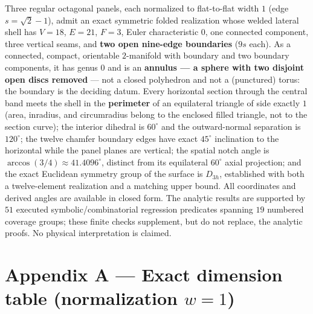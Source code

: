 \documentclass[
  11pt,
  a4paper,
]{article}
\begin{document}
Three regular octagonal panels, each normalized to flat-to-flat width \(1\) (edge \(s=\sqrt2-1\)), admit an exact symmetric folded realization whose welded lateral shell has \(V=18\), \(E=21\), \(F=3\), Euler characteristic \(0\), one connected component, three vertical seams, and \textbf{two open nine-edge boundaries} (\(9s\) each). As a connected, compact, orientable \(2\)-manifold with boundary and two boundary components, it has genus \(0\) and is an \textbf{annulus --- a sphere with two disjoint open discs removed} --- not a closed polyhedron and not a (punctured) torus: the boundary is the deciding datum. Every horizontal section through the central band meets the shell in the \textbf{perimeter} of an equilateral triangle of side exactly \(1\) (area, inradius, and circumradius belong to the enclosed filled triangle, not to the section curve); the interior dihedral is \(60^\circ\) and the outward-normal separation is \(120^\circ\); the twelve chamfer boundary edges have exact \(45^\circ\) inclination to the horizontal while the panel planes are vertical; the spatial notch angle is \(\arccos(3/4)\approx41.4096^\circ\), distinct from its equilateral \(60^\circ\) axial projection; and the exact Euclidean symmetry group of the surface is \(D_{3h}\), established with both a twelve-element realization and a matching upper bound. All coordinates and derived angles are available in closed form. The analytic results are supported by \(51\) executed symbolic/combinatorial regression predicates spanning \(19\) numbered coverage groups; these finite checks supplement, but do not replace, the analytic proofs. No physical interpretation is claimed.

\clearpage

\section{\texorpdfstring{Appendix A --- Exact dimension table (normalization \(w=1\))}{Appendix A --- Exact dimension table (normalization w=1)}}\label{appendix-a-exact-dimension-table-normalization-w1}

\begingroup\fontsize{9.3}{12}\selectfont\setlength{\tabcolsep}{4pt}\renewcommand{\arraystretch}{1.3}
\end{document}

